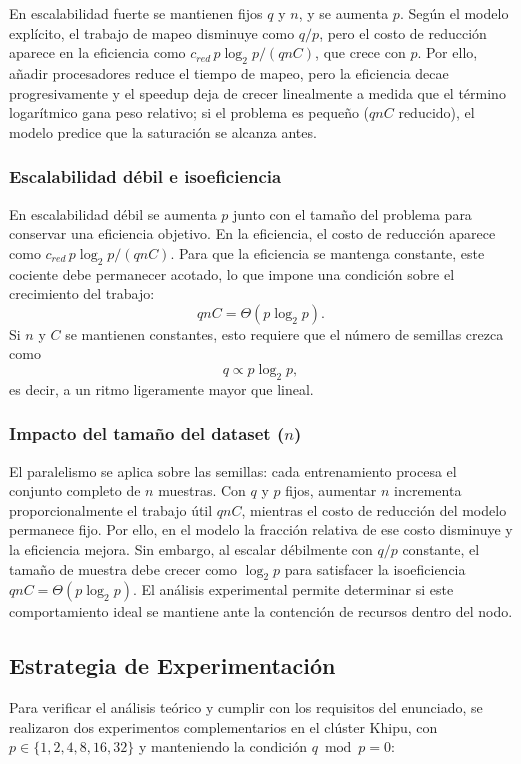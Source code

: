 \documentclass[11pt, a4paper]{article}
\begin{document}
En escalabilidad fuerte se mantienen fijos $q$ y $n$, y se aumenta $p$. Según el modelo explícito, el trabajo de mapeo disminuye como $q/p$, pero el costo de reducción aparece en la eficiencia como $c_{red}\,p\log_2 p/(qnC)$, que crece con $p$. Por ello, añadir procesadores reduce el tiempo de mapeo, pero la eficiencia decae progresivamente y el speedup deja de crecer linealmente a medida que el término logarítmico gana peso relativo; si el problema es pequeño ($qnC$ reducido), el modelo predice que la saturación se alcanza antes.

\subsubsection{Escalabilidad débil e isoeficiencia}

En escalabilidad débil se aumenta $p$ junto con el tamaño del problema para conservar una eficiencia objetivo. En la eficiencia, el costo de reducción aparece como $c_{red}\,p\log_2 p/(qnC)$. Para que la eficiencia se mantenga constante, este cociente debe permanecer acotado, lo que impone una condición sobre el crecimiento del trabajo:
\[
qnC=\Theta(p\log_2 p).
\]
Si $n$ y $C$ se mantienen constantes, esto requiere que el número de semillas crezca como
\[
q \propto p\log_2 p,
\]
es decir, a un ritmo ligeramente mayor que lineal.

\subsubsection{Impacto del tamaño del dataset ($n$)}

El paralelismo se aplica sobre las semillas: cada entrenamiento procesa el conjunto completo de $n$ muestras. Con $q$ y $p$ fijos, aumentar $n$ incrementa proporcionalmente el trabajo útil $qnC$, mientras el costo de reducción del modelo permanece fijo. Por ello, en el modelo la fracción relativa de ese costo disminuye y la eficiencia mejora. Sin embargo, al escalar débilmente con $q/p$ constante, el tamaño de muestra debe crecer como $\log_2 p$ para satisfacer la isoeficiencia $qnC=\Theta(p\log_2 p)$. El análisis experimental permite determinar si este comportamiento ideal se mantiene ante la contención de recursos dentro del nodo.

\subsection{Estrategia de Experimentación}

Para verificar el análisis teórico y cumplir con los requisitos del enunciado, se realizaron dos experimentos complementarios en el clúster Khipu, con $p \in \{1, 2, 4, 8, 16, 32\}$ y manteniendo la condición $q \bmod p = 0$:
\end{document}
